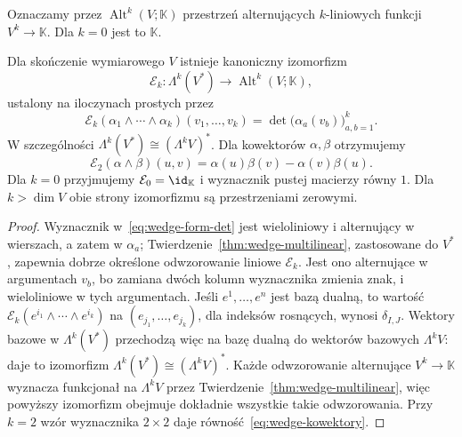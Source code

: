 Oznaczamy przez $\operatorname{Alt}^k(V;\mathbb K)$ przestrzeń
alternujących $k$-liniowych funkcji $V^k\to\mathbb K$.
Dla $k=0$ jest to $\mathbb K$.

\begin{twierdzenie}
\label{thm:dual-zewnetrzny}
Dla skończenie wymiarowego $V$ istnieje kanoniczny izomorfizm
\[
 \mathcal E_k\colon\Lambda^k(V^*)
 \longrightarrow\operatorname{Alt}^k(V;\mathbb K),
\]
ustalony na iloczynach prostych przez
\begin{equation}\label{eq:wedge-form-det}
 \mathcal E_k(\alpha_1\wedge\cdots\wedge\alpha_k)
 (v_1,\ldots,v_k)
 =\det\bigl(\alpha_a(v_b)\bigr)_{a,b=1}^k.
\end{equation}
W szczególności $\Lambda^k(V^*)\cong(\Lambda^k V)^*$.
Dla kowektorów $\alpha,\beta$ otrzymujemy
\begin{equation}\label{eq:wedge-kowektory}
 \mathcal E_2(\alpha\wedge\beta)(u,v)
 =\alpha(u)\beta(v)-\alpha(v)\beta(u).
\end{equation}
Dla $k=0$ przyjmujemy $\mathcal E_0=\id_{\mathbb K}$ i wyznacznik
pustej macierzy równy $1$. Dla $k>\dim V$ obie strony izomorfizmu
są przestrzeniami zerowymi.
\end{twierdzenie}
\begin{proof}
Wyznacznik w~\eqref{eq:wedge-form-det} jest wieloliniowy
i alternujący w wierszach, a zatem w $\alpha_a$;
Twierdzenie~\ref{thm:wedge-multilinear}, zastosowane do $V^*$,
zapewnia dobrze określone odwzorowanie liniowe $\mathcal E_k$.
Jest ono alternujące w argumentach $v_b$, bo zamiana dwóch
kolumn wyznacznika zmienia znak, i wieloliniowe w tych
argumentach. Jeśli $e^1,\ldots,e^n$ jest bazą dualną,
to wartość $\mathcal E_k(e^{i_1}\wedge\cdots\wedge e^{i_k})$
na $(e_{j_1},\ldots,e_{j_k})$, dla indeksów rosnących,
wynosi $\delta_{I,J}$. Wektory bazowe w
$\Lambda^k(V^*)$ przechodzą więc na bazę dualną do
wektorów bazowych $\Lambda^k V$: daje to izomorfizm
$\Lambda^k(V^*)\cong(\Lambda^k V)^*$.
Każde odwzorowanie alternujące $V^k\to\mathbb K$ wyznacza
funkcjonał na $\Lambda^k V$ przez
Twierdzenie~\ref{thm:wedge-multilinear}, więc powyższy
izomorfizm obejmuje dokładnie wszystkie takie odwzorowania.
Przy $k=2$ wzór wyznacznika $2\times2$ daje
równość~\eqref{eq:wedge-kowektory}.
\end{proof}

